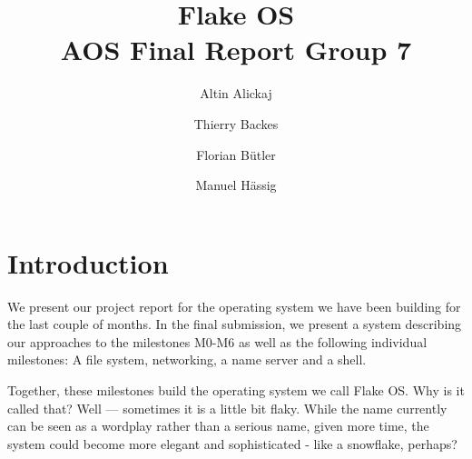 \documentclass[11pt,
a4paper,
oneside,
abstract=true,
bibliography=notoc,
numbers=noenddot,
toc=nolistof
]{scrreprt}
\title{Flake OS\\\hspace{1em} \large AOS Final Report Group 7}
\author{Altin Alickaj \and Thierry Backes \and Florian Bütler \and Manuel Hässig}
\begin{document}
\maketitle

\tableofcontents

\chapter{Introduction}
We present our project report for the operating system we have been building for the last couple of months. 
In the final submission, we present a system describing our approaches to the milestones M0-M6 as well as the 
following individual milestones: A file system, networking, a name server and a shell.

Together, these milestones build the operating system we call Flake OS. Why is it called that?
Well --- sometimes it is a little bit flaky. While the name currently can be seen as a wordplay rather than a serious name, given more time, the system could become more elegant and sophisticated - like a snowflake, perhaps?















\end{document}
